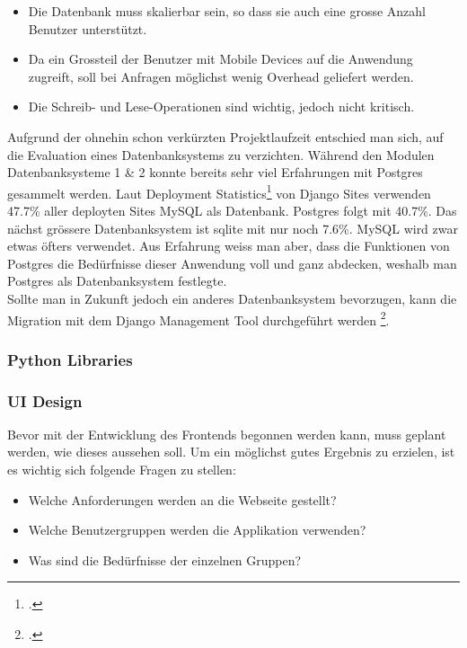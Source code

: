 \begin{itemize}
	\item Die Datenbank muss skalierbar sein, so dass sie auch eine grosse Anzahl Benutzer unterstützt.
	\item Da ein Grossteil der Benutzer mit Mobile Devices auf die Anwendung zugreift, soll bei Anfragen möglichst wenig Overhead geliefert werden.
	\item Die Schreib- und Lese-Operationen sind wichtig, jedoch nicht kritisch. 
\end{itemize}

Aufgrund der ohnehin schon verkürzten Projektlaufzeit entschied man sich, auf die Evaluation eines Datenbanksystems zu verzichten. Während den Modulen Datenbanksysteme 1 \& 2 konnte bereits sehr viel Erfahrungen mit Postgres gesammelt werden. Laut Deployment Statistics\footcite{deploymentstatistics} von Django Sites verwenden 47.7\% aller deployten Sites MySQL als Datenbank. Postgres folgt mit 40.7\%. Das nächst grössere Datenbanksystem ist sqlite mit nur noch 7.6\%.
MySQL wird zwar etwas öfters verwendet. Aus Erfahrung weiss man aber, dass die Funktionen von Postgres die Bedürfnisse dieser Anwendung voll und ganz abdecken, weshalb man Postgres als Datenbanksystem festlegte. \\

Sollte man in Zukunft jedoch ein anderes Datenbanksystem bevorzugen, kann die Migration mit dem Django Management Tool durchgeführt werden \footcite{dbmigration}. 

\subsubsection*{Python Libraries}

\subsubsection{UI Design}
Bevor mit der Entwicklung des Frontends begonnen werden kann, muss geplant werden, wie dieses aussehen soll. Um ein möglichst gutes Ergebnis zu erzielen, ist es wichtig sich folgende Fragen zu stellen:

\begin{itemize}
	\item Welche Anforderungen werden an die Webseite gestellt?
	\item Welche Benutzergruppen werden die Applikation verwenden?
	\item Was sind die Bedürfnisse der einzelnen Gruppen?
\end{itemize}


